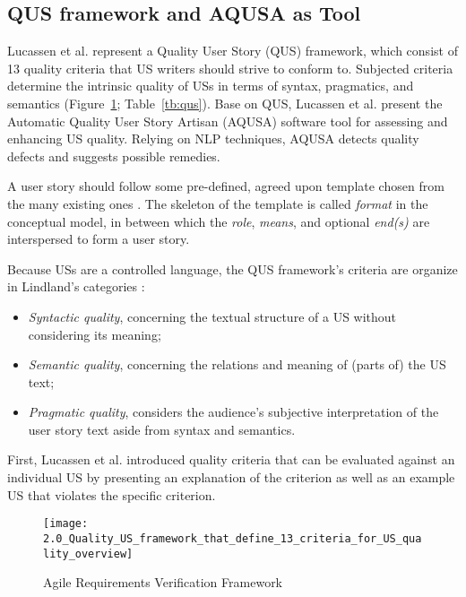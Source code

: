 \subsection{QUS framework and AQUSA as Tool}\label{quality-framework}
Lucassen et al. \cite{lucassen2016improving} represent a Quality User Story (QUS) framework, which consist of 13 quality criteria that US writers should strive to conform to. Subjected criteria determine the intrinsic quality of USs in terms of syntax, pragmatics, and semantics (Figure~\ref{fig:qus_framework}; Table~\ref{tb:qus}). Base on QUS, Lucassen et al. present the Automatic Quality User Story Artisan (AQUSA) software tool for assessing and enhancing US quality. Relying on NLP techniques, AQUSA detects quality defects and suggests possible remedies.

A user story should follow some pre-defined, agreed upon template chosen from the many existing ones \cite{wautelet2014unifying}. The skeleton of the template is called \emph{format} in the conceptual model, in between which the \emph{role}, \emph{means}, and optional \emph{end(s)} are interspersed to form a user story. 

Because USs are a controlled language, the QUS framework’s criteria are organize in Lindland’s categories \cite{lindland1994understanding}:

\begin{itemize}
\item\emph{ Syntactic quality}, concerning the textual structure of a US without considering its meaning;
\item \emph{Semantic quality}, concerning the relations and meaning of (parts of) the US text;
\item \emph{Pragmatic quality}, considers the audience’s subjective interpretation of the user story text aside from syntax and semantics.
\end{itemize}

First, Lucassen et al. introduced quality criteria that can be evaluated against an individual US by presenting an explanation of the criterion as well as an example US that violates the specific criterion.


\begin{figure}
\center
\texttt{[image: 2.0\_Quality\_US\_framework\_that\_define\_13\_criteria\_for\_US\_quality\_overview]}
\caption{Agile Requirements Verification Framework \cite{lucassen2016improving}}\label{fig:qus_framework}
\end{figure}

